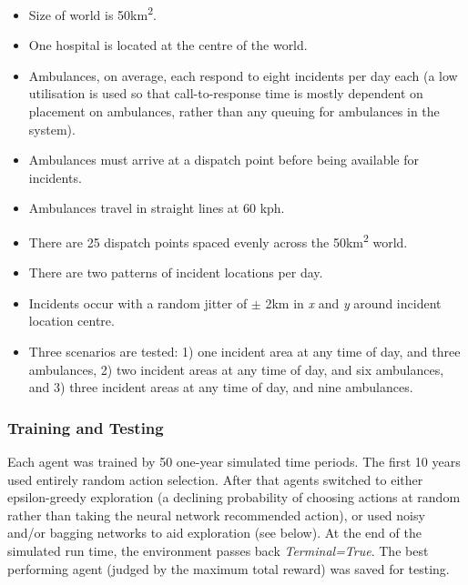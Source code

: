 \documentclass{article}
\begin{document}
\begin{itemize}
    
    \item Size of world is 50km\textsuperscript{2}.
    
    \item One hospital is located at the centre of the world.
    
    \item Ambulances, on average, each respond to eight incidents per day each (a low utilisation is used so that call-to-response time is mostly dependent on placement on ambulances, rather than any queuing for ambulances in the system).
    
    \item Ambulances must arrive at a dispatch point before being available for incidents.
    
    \item Ambulances travel in straight lines at 60 kph.
    
    \item There are 25 dispatch points spaced evenly across the 50km\textsuperscript{2} world.
    
    \item There are two patterns of incident locations per day.
    
    \item Incidents occur with a random jitter of $\pm$ 2km in \emph{x} and \emph{y} around incident location centre.
    
    \item Three scenarios are tested: 1) one incident area at any time of day, and three ambulances, 2) two incident areas at any time of day, and six ambulances, and 3) three incident areas at any time of day, and nine ambulances. 
    
\end{itemize}

\subsubsection{Training and Testing}

Each agent was trained by 50 one-year simulated time periods. The first 10 years used entirely random action selection. After that agents switched to either epsilon-greedy exploration (a declining probability of choosing actions at random rather than taking the neural network recommended action), or used noisy and/or bagging networks to aid exploration (see below). At the end of the simulated run time, the environment passes back \emph{Terminal=True}. The best performing agent (judged by the maximum total reward) was saved for testing.
\end{document}
